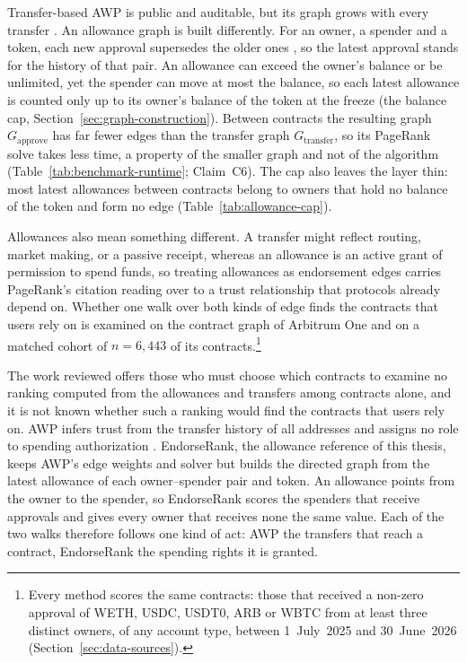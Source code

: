 Transfer-based AWP is public and auditable, but its graph grows with every transfer \parencite{do2023awp}. An allowance graph is built differently. For an owner, a spender and a token, each new approval supersedes the older ones \parencite{vogelsteller2015erc20}, so the latest approval stands for the history of that pair. An allowance can exceed the owner's balance or be unlimited, yet the spender can move at most the balance, so each latest allowance is counted only up to its owner's balance of the token at the freeze (the balance cap, Section~\ref{sec:graph-construction}). Between contracts the resulting graph $G_{\text{approve}}$ has far fewer edges than the transfer graph $G_{\text{transfer}}$, so its PageRank solve takes less time, a property of the smaller graph and not of the algorithm (Table~\ref{tab:benchmark-runtime}; Claim~C6). The cap also leaves the layer thin: most latest allowances between contracts belong to owners that hold no balance of the token and form no edge (Table~\ref{tab:allowance-cap}).

Allowances also mean something different. A transfer might reflect routing, market making, or a passive receipt, whereas an allowance is an active grant of permission to spend funds, so treating allowances as endorsement edges carries PageRank's citation reading \parencite{page1999pagerank} over to a trust relationship that protocols already depend on. Whether one walk over both kinds of edge finds the contracts that users rely on is examined on the contract graph of Arbitrum One and on a matched cohort of $n=6{,}443$ of its contracts.\footnote{Every method scores the same contracts: those that received a non-zero approval of WETH, USDC, USDT0, ARB or WBTC from at least three distinct owners, of any account type, between 1~July~2025 and 30~June~2026 (Section~\ref{sec:data-sources}).}


The work reviewed offers those who must choose which contracts to examine no ranking computed from the allowances and transfers among contracts alone, and it is not known whether such a ranking would find the contracts that users rely on. AWP infers trust from the transfer history of all addresses and assigns no role to spending authorization \parencite{do2023awp}. EndorseRank, the allowance reference of this thesis, keeps AWP's edge weights and solver but builds the directed graph from the latest allowance of each owner--spender pair and token. An allowance points from the owner to the spender, so EndorseRank scores the spenders that receive approvals and gives every owner that receives none the same value. Each of the two walks therefore follows one kind of act: AWP the transfers that reach a contract, EndorseRank the spending rights it is granted.


